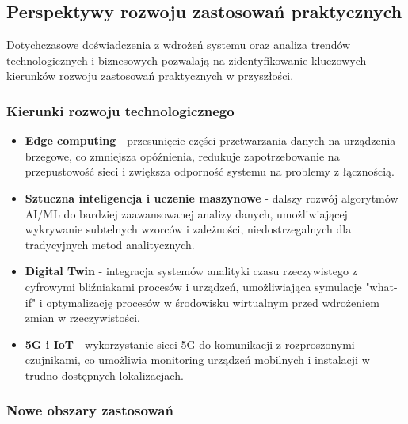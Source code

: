 \subsection{Perspektywy rozwoju zastosowań praktycznych}
\label{subsec:perspektywy_rozwoju}

Dotychczasowe doświadczenia z wdrożeń systemu oraz analiza trendów technologicznych i biznesowych pozwalają na zidentyfikowanie kluczowych kierunków rozwoju zastosowań praktycznych w przyszłości.

\subsubsection{Kierunki rozwoju technologicznego}
\label{subsubsec:kierunki_rozwoju_tech}

\begin{itemize}
    \item \textbf{Edge computing} - przesunięcie części przetwarzania danych na urządzenia brzegowe, co zmniejsza opóźnienia, redukuje zapotrzebowanie na przepustowość sieci i zwiększa odporność systemu na problemy z łącznością.
    \item \textbf{Sztuczna inteligencja i uczenie maszynowe} - dalszy rozwój algorytmów AI/ML do bardziej zaawansowanej analizy danych, umożliwiającej wykrywanie subtelnych wzorców i zależności, niedostrzegalnych dla tradycyjnych metod analitycznych.
    \item \textbf{Digital Twin} - integracja systemów analityki czasu rzeczywistego z cyfrowymi bliźniakami procesów i urządzeń, umożliwiająca symulacje "what-if" i optymalizację procesów w środowisku wirtualnym przed wdrożeniem zmian w rzeczywistości.
    \item \textbf{5G i IoT} - wykorzystanie sieci 5G do komunikacji z rozproszonymi czujnikami, co umożliwia monitoring urządzeń mobilnych i instalacji w trudno dostępnych lokalizacjach.
\end{itemize}

\subsubsection{Nowe obszary zastosowań}
\label{subsubsec:nowe_obszary}


